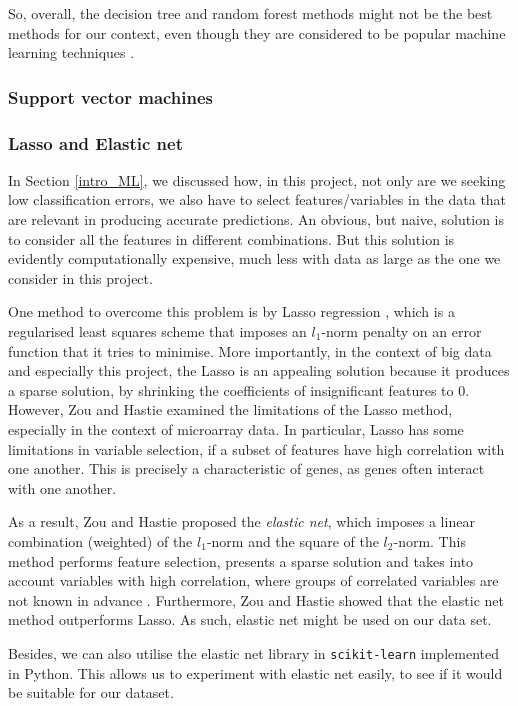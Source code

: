 \documentclass[12pt, twoside, a4paper]{article}
\begin{document}
So, overall, the decision tree and random forest methods might not be the best methods for our context, even though they are considered to be popular machine learning techniques \cite{RefWorks:103}.

\subsubsection{Support vector machines}


\subsubsection{Lasso and Elastic net}
In Section \ref{intro_ML}, we discussed how, in this project, not only are we seeking low classification errors, we also have to select features/variables in the data that are relevant in producing accurate predictions. An obvious, but naive, solution is to consider all the features in different combinations. But this solution is evidently computationally expensive, much less with data as large as the one we consider in this project.

One method to overcome this problem is by Lasso regression \cite{RefWorks:94}, which is a regularised least squares scheme that imposes an $l_1$-norm penalty on an error function that it tries to minimise. More importantly, in the context of big data and especially this project, the Lasso is an appealing solution because it produces a sparse solution, by shrinking the coefficients of insignificant features to 0. However, Zou and Hastie \cite{RefWorks:96} examined the limitations of the Lasso method, especially in the context of microarray data. In particular, Lasso has some limitations in variable selection, if a subset of features have high correlation with one another. This is precisely a characteristic of genes, as genes often interact with one another.

As a result, Zou and Hastie proposed the \textit{elastic net}, which imposes a linear combination (weighted) of the $l_1$-norm and the square of the $l_2$-norm. This method performs feature selection, presents a sparse solution and takes into account variables with high correlation, where groups of correlated variables are not known in advance \cite{RefWorks:93}. Furthermore, Zou and Hastie showed that the elastic net method outperforms Lasso. As such, elastic net might be used on our data set.

Besides, we can also utilise the elastic net library in \texttt{scikit-learn} implemented in Python. This allows us to experiment with elastic net easily, to see if it would be suitable for our dataset.
\end{document}
